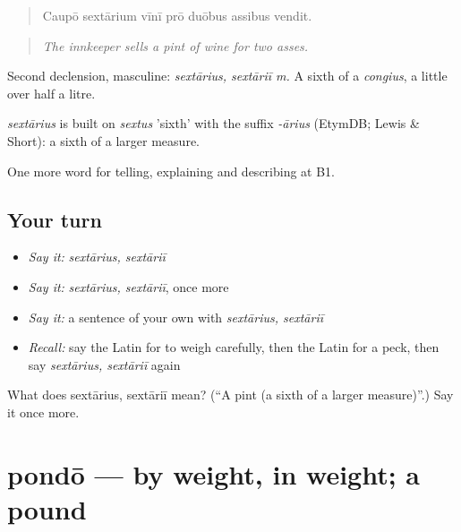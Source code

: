 \begin{quote}
Caupō sextārium vīnī prō duōbus assibus vendit.
\end{quote}

\begin{quote}
\emph{The innkeeper sells a pint of wine for two asses.}
\end{quote}

Second declension, masculine: \emph{sextārius, sextāriī m.} A sixth of a \emph{congius}, a little over half a litre.

\begin{cousinweb}
\emph{sextārius} is built on \emph{sextus} 'sixth' with the suffix \emph{-ārius} (EtymDB; Lewis \& Short): a sixth of a larger measure.
\end{cousinweb}

\begin{grammarlens}[title={What you've built}]
One more word for telling, explaining and describing at B1.
\end{grammarlens}

\subsection*{Your turn}
\begin{itemize}
\raggedright
  \item \emph{Say it:} \emph{sextārius, sextāriī}
  \item \emph{Say it:} \emph{sextārius, sextāriī}, once more
  \item \emph{Say it:} a sentence of your own with \emph{sextārius, sextāriī}
  \item \emph{Recall:} say the Latin for to weigh carefully, then the Latin for a peck, then say \emph{sextārius, sextāriī} again
\end{itemize}

\begin{tcolorbox}[breakable,colback=teal!4,colframe=teal!35!black,title={Before you move on}]
What does sextārius, sextāriī mean? (\textquotedblleft{}A pint (a sixth of a larger measure)\textquotedblright{}.) Say it once more.
\end{tcolorbox}
\section[pondō]{pondō — by weight, in weight; a pound}

\label{lesson:LA-C465-pondo}




